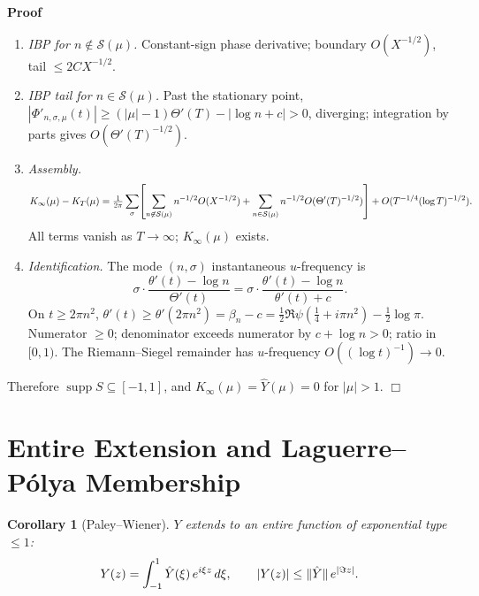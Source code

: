 \documentclass{article}
\newcommand{\nin}{\not\in}
\newcommand{\tmem}[1]{{\em #1\/}}
\newcommand{\tmop}[1]{\ensuremath{\operatorname{#1}}}
\newenvironment{proof}{\noindent\textbf{Proof\ }}{\hspace*{\fill}$\Box$\medskip}
\newtheorem{corollary}{Corollary}
\newcommand{\supp}{\tmop{supp}}
\begin{document}
\begin{proof}
\begin{enumerate}
    \item {\tmem{IBP for $n \nin \mathcal{S} (\mu)$.}} Constant-sign phase
    derivative; boundary $O (X^{- 1 / 2})$, tail $\le 2 CX^{- 1 / 2}$.
    
    \item {\tmem{IBP tail for $n \in \mathcal{S} (\mu)$.}} Past the stationary
    point, $| \Phi'_{n, \sigma, \mu} (t) | \ge (| \mu | - 1) \Theta' (T) - |
    \log n + c| > 0$, diverging; integration by parts gives $O (\Theta' (T)^{-
    1 / 2})$.
    
    \item {\tmem{Assembly.}}
    \[ K_{\infty} (\mu) - K_T (\mu) = \tfrac{1}{2 \pi} \sum_{\sigma}
       \hspace{-0.17em} \left[ \sum_{n \nin \mathcal{S}(\mu)} n^{- 1 / 2} O
       (X^{- 1 / 2}) + \sum_{n \in \mathcal{S}(\mu)} n^{- 1 / 2} O (\Theta'
       (T)^{- 1 / 2}) \right] + O (T^{- 1 / 4} (\log T)^{- 1 / 2}) . \]
    All terms vanish as $T \to \infty$; $K_{\infty} (\mu)$ exists.
    
    \item {\tmem{Identification.}} The mode $(n, \sigma)$ instantaneous
    $u$-frequency is
    \[ \sigma \cdot \frac{\theta' (t) - \log n}{\Theta' (t)} = \sigma \cdot
       \frac{\theta' (t) - \log n}{\theta' (t) + c} . \]
    On $t \ge 2 \pi n^2$, $\theta' (t) \ge \theta'  (2 \pi n^2) = \beta_n - c
    = \tfrac{1}{2} \Re \psi (\tfrac{1}{4} + i \pi n^2) - \tfrac{1}{2} \log
    \pi$. Numerator $\ge 0$; denominator exceeds numerator by $c + \log n >
    0$; ratio in $[0, 1)$. The Riemann--Siegel remainder has $u$-frequency $O
    ((\log t)^{- 1}) \to 0$.
  \end{enumerate}
  Therefore $\supp S \subseteq [- 1, 1]$, and $K_{\infty} (\mu) = \hat{Y}
  (\mu) = 0$ for $| \mu | > 1$.
\end{proof}

\section{Entire Extension and Laguerre--P{\'o}lya Membership}

\begin{corollary}
  [Paley--Wiener]\label{cor:PW} $Y$ extends to an entire function of
  exponential type $\le 1$:
  \[ Y (z) = \int_{- 1}^1 \hat{Y} (\xi)  \hspace{0.17em} e^{i \xi z} 
     \hspace{0.17em} d \xi, \qquad |Y (z) | \le \| \hat{Y} \|  \hspace{0.17em}
     e^{| \Im z|} . \]
\end{corollary}
\end{document}

